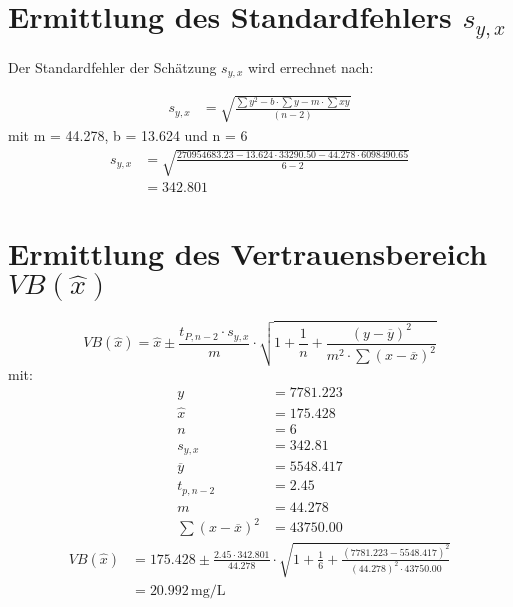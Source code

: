 \documentclass{article}
\newcommand\tabellenwerte{\directlua{tabelle()}}
\begin{document}
\section{Ermittlung des Standardfehlers $s_{y,x}$}
\tabellenwerte
\begin{flushleft}
Der Standardfehler der Schätzung $s_{y,x}$ wird errechnet nach:
\end{flushleft}
\begin{align}
 s_{y,x} &= \sqrt{\frac{\sum y^2 - b \cdot \sum y - m \cdot \sum xy}{(n-2)}}
\end{align}
mit m = 44.278, b = 13.624 und n = 6
\begin{align*}
  s_{y,x} &=\sqrt{ \frac{270954683.23 - 13.624 \cdot 33290.50 -44.278 \cdot 6098490.65} {6-2}} \\
  &= 342.801
\end{align*}
\section{Ermittlung des Vertrauensbereich $ VB(\hat{x}) $}
\begin{equation}
  VB(\hat{x}) = \hat{x} \pm \frac{t_{P,n-2} \cdot s _{y,x}}{m} \cdot \sqrt{1+\frac{1}{n}+\frac{(y-\overline{y})^2}{m^2 \cdot \sum (x -\overline{x})^2}}
\end{equation}
mit:
\begin{align*}
   y &= 7781.223 \\
   \hat{x} & = 175.428 \\
   n &= 6 \\
   s_{y,x} &= 342.81 \\
   \overline{y} & = 5548.417 \\
   t_{p,n-2} &= 2.45 \\
   m &= 44.278\\
   \sum (x -\overline{x})^2&= 43750.00
 \end{align*}
\begin{align*}
   VB(\hat{x}) &= 175.428 \pm \frac{2.45 \cdot 342.801}{44.278} \cdot  \sqrt{1+\frac{1}{6}+\frac{(7781.223-5548.417)^2}{(44.278)^2 \cdot 43750.00 }}\\
    &=20.992 \, \si{\milli\gram\per\liter}
 \end{align*}
\end{document}
